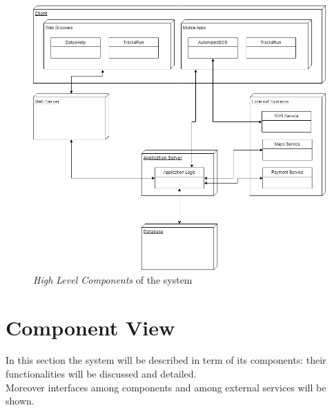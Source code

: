 \begin{figure}[H]
  \begin{center}
  	\includegraphics[width=\textwidth]{./img/HighLevelComponents.png}
    \hspace{0.05\linewidth}
    \centering
    \caption{\textit{High Level Components} of the system}
		\label{img:highLevelComponents}
    \end{center}
\end{figure}

\section{Component View}
In this section the system will be described in term of its components:  their functionalities will be discussed and detailed.\\
Moreover interfaces among components and among external services will be shown.

\clearpage
